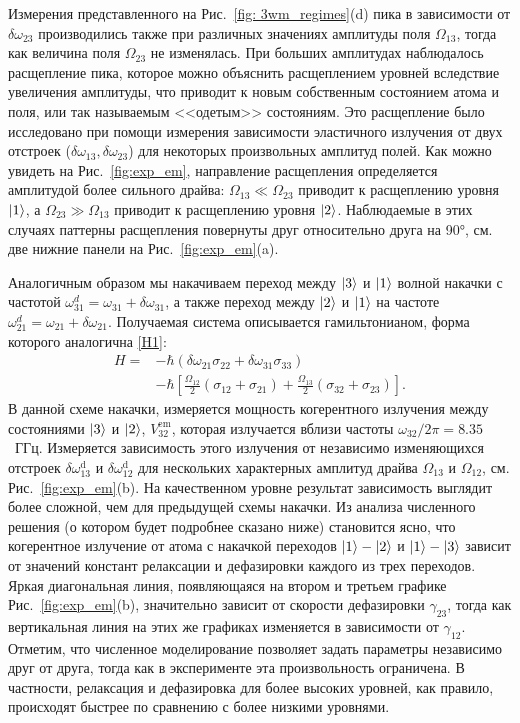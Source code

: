 Измерения представленного на Рис.~\ref{fig: 3wm_regimes}(d) пика в зависимости от $\delta\omega_{23}$ производились также при различных значениях амплитуды поля $\Omega_{13}$, тогда как величина поля $\Omega_{23}$ не изменялась. При больших амплитудах наблюдалось расщепление пика, которое можно объяснить расщеплением уровней вследствие увеличения амплитуды, что приводит к новым собственным состоянием атома и поля, или так называемым <<одетым>> состояниям. Это расщепление было исследовано при помощи измерения зависимости эластичного излучения от двух отстроек ($\delta\omega_{13}, \delta\omega_{23}$) для некоторых произвольных амплитуд полей. Как можно увидеть на Рис.~\ref{fig:exp_em}, направление расщепления определяется амплитудой более сильного драйва: $\Omega_{13}\ll\Omega_{23}$ приводит к расщеплению уровня $\ket{1}$, а $\Omega_{23}\gg\Omega_{13}$ приводит к расщеплению уровня $\ket{2}$. Наблюдаемые в этих случаях паттерны расщепления повернуты друг относительно друга на \ang{90}, см. две нижние панели на Рис.~\ref{fig:exp_em}(a).

Аналогичным образом мы накачиваем переход между $\ket{3}$ и $\ket{1}$ волной накачки с частотой $\omega_{31}^{d}=\omega_{31}+\delta\omega_{31}$, а также переход между $
\ket{2}$ и $\ket{1}$ на частоте $\omega_{21}^{d}=\omega_{21}+\delta\omega_{21}$. Получаемая система описывается гамильтонианом, форма которого аналогична \eqref{H1}:
\begin{equation}
	\begin{aligned}
		H={}&-\hbar(\delta\omega_{21}\sigma_{22}+\delta\omega_{31}\sigma_{33})\\
		&-\hbar\left[\frac{\Omega_{12}}{2}(\sigma_{12}+\sigma_{21})+\frac{\Omega_{13}}{2}(\sigma_{32}+\sigma_{23})\right].
	\end{aligned}
\label{H2}
\end{equation}
В данной схеме накачки, измеряется мощность когерентного излучения между состояниями $\ket{3}$ и $\ket{2}$, $V_{32}^{\text{em}}$, которая излучается вблизи частоты $\omega_{32}/2\pi=8.35$~ГГц. Измеряется зависимость этого излучения от независимо изменяющихся отстроек $\delta\omega^{\text{d}}_{13}$ и $\delta\omega^{\text{d}}_{12}$ для нескольких характерных амплитуд драйва $\Omega_{13}$ и $\Omega_{12}$, см. Рис.~\ref{fig:exp_em}(b). На качественном уровне результат зависимость выглядит более сложной, чем для предыдущей схемы накачки. Из анализа численного решения (о котором будет подробнее сказано ниже) становится ясно, что когерентное излучение от атома с накачкой переходов $\ket{1}-\ket{2}$ и $\ket{1}-\ket{3}$ зависит от значений констант релаксации и дефазировки каждого из трех переходов. Яркая диагональная линия, появляющаяся на втором и третьем графике Рис.~\ref{fig:exp_em}(b), значительно зависит от скорости дефазировки $\gamma_{23}$, тогда как вертикальная линия на этих же графиках изменяется в зависимости от $\gamma_{12}$. Отметим, что численное моделирование позволяет задать параметры независимо друг от друга, тогда как в эксперименте эта произвольность ограничена. В частности, релаксация и дефазировка для более высоких уровней, как правило, происходят быстрее по сравнению с более низкими уровнями. 

